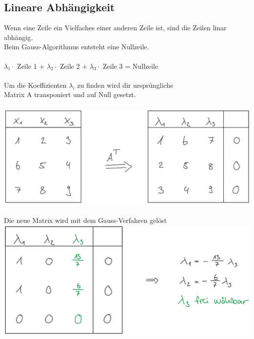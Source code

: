 			
			\vfill\null
			\columnbreak		    
		    
		    
		    
		    \subsection{Lineare Abhängigkeit}
		    Wenn eine Zeile ein Vielfaches einer anderen Zeile ist, sind die Zeilen linar abhängig. \\
		    Beim Gauss-Algorithmus entsteht eine Nullzeile. \\
		    \\
		    $\lambda_1 \cdot$ Zeile 1 + $\lambda_2 \cdot$ Zeile 2 + $\lambda_3 \cdot$ Zeile 3 = Nullzeile \\
		    \\
		    Um die Koeffizienten $\lambda_i$ zu finden wird dir ursprüngliche \\
		    Matrix A transponiert und auf Null gesetzt. \\
		    \\
		    \includegraphics[width=0.5\linewidth]{Bilder/lineare-abhaengigkeit_1} \\
		    \\
		    Die neue Matrix wird mit dem Gauss-Verfahren gelöst\\
		    
		    \includegraphics[width=0.5\linewidth]{Bilder/lineare-abhaengigkeit_2} \\
		    
		    
		    
